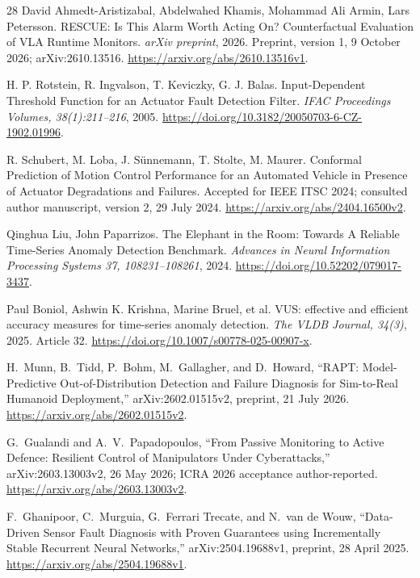 \begin{thebibliography}{28}
 David Ahmedt-Aristizabal, Abdelwahed Khamis, Mohammad Ali Armin, Lars Petersson. {RESCUE: Is This Alarm Worth Acting On? Counterfactual Evaluation of VLA Runtime Monitors}. \emph{arXiv preprint}, 2026. Preprint, version 1, 9 October 2026; arXiv:2610.13516. \url{https://arxiv.org/abs/2610.13516v1}.

 H. P. Rotstein, R. Ingvalson, T. Keviczky, G. J. Balas. {Input-Dependent Threshold Function for an Actuator Fault Detection Filter}. \emph{IFAC Proceedings Volumes, 38(1):211--216}, 2005. \url{https://doi.org/10.3182/20050703-6-CZ-1902.01996}.

 R. Schubert, M. Loba, J. S\"unnemann, T. Stolte, M. Maurer. {Conformal Prediction of Motion Control Performance for an Automated Vehicle in Presence of Actuator Degradations and Failures}. Accepted for IEEE ITSC 2024; consulted author manuscript, version 2, 29 July 2024. \url{https://arxiv.org/abs/2404.16500v2}.

 Qinghua Liu, John Paparrizos. {The Elephant in the Room: Towards A Reliable Time-Series Anomaly Detection Benchmark}. \emph{Advances in Neural Information Processing Systems 37, 108231--108261}, 2024. \url{https://doi.org/10.52202/079017-3437}.

 Paul Boniol, Ashwin K. Krishna, Marine Bruel, et al. {VUS: effective and efficient accuracy measures for time-series anomaly detection}. \emph{The VLDB Journal, 34(3)}, 2025. Article 32. \url{https://doi.org/10.1007/s00778-025-00907-x}.


H.~Munn, B.~Tidd, P.~Bohm, M.~Gallagher, and D.~Howard,
``RAPT: Model-Predictive Out-of-Distribution Detection and Failure Diagnosis for Sim-to-Real Humanoid Deployment,''
arXiv:2602.01515v2, preprint, 21 July 2026.
\url{https://arxiv.org/abs/2602.01515v2}.

G.~Gualandi and A.~V.~Papadopoulos,
``From Passive Monitoring to Active Defence: Resilient Control of Manipulators Under Cyberattacks,''
arXiv:2603.13003v2, 26 May 2026; ICRA 2026 acceptance author-reported.
\url{https://arxiv.org/abs/2603.13003v2}.

F.~Ghanipoor, C.~Murguia, G.~Ferrari Trecate, and N.~van de Wouw,
``Data-Driven Sensor Fault Diagnosis with Proven Guarantees using Incrementally Stable Recurrent Neural Networks,''
arXiv:2504.19688v1, preprint, 28 April 2025.
\url{https://arxiv.org/abs/2504.19688v1}.


\end{thebibliography}
